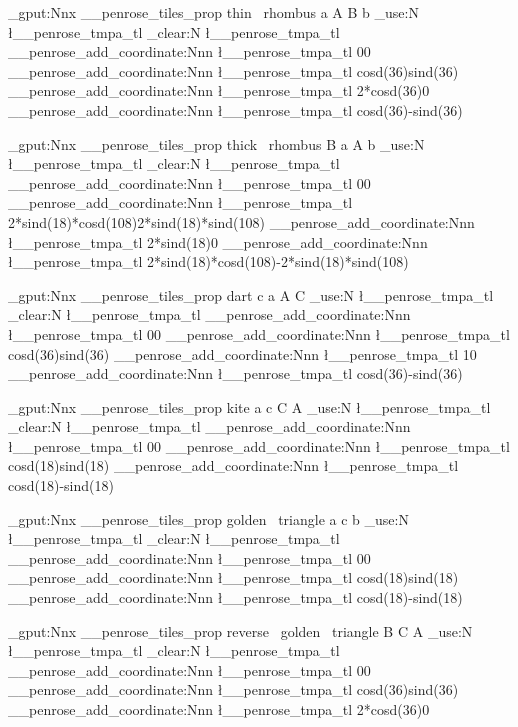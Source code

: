 \prop_gput:Nnx \g__penrose_tiles_prop {thin~ rhombus}
{{a A B b} {\tl_use:N \l__penrose_tmpa_tl}}
\tl_clear:N \l__penrose_tmpa_tl
\__penrose_add_coordinate:Nnn \l__penrose_tmpa_tl {0}{0}
\__penrose_add_coordinate:Nnn \l__penrose_tmpa_tl {cosd(36)}{sind(36)}
\__penrose_add_coordinate:Nnn \l__penrose_tmpa_tl {2*cosd(36)}{0}
\__penrose_add_coordinate:Nnn \l__penrose_tmpa_tl {cosd(36)}{-sind(36)}

\prop_gput:Nnx \g__penrose_tiles_prop {thick~ rhombus}
{{B a A b} {\tl_use:N \l__penrose_tmpa_tl}}
\tl_clear:N \l__penrose_tmpa_tl
\__penrose_add_coordinate:Nnn \l__penrose_tmpa_tl {0}{0}
\__penrose_add_coordinate:Nnn \l__penrose_tmpa_tl
{2*sind(18)*cosd(108)}{2*sind(18)*sind(108)}
\__penrose_add_coordinate:Nnn \l__penrose_tmpa_tl {2*sind(18)}{0}
\__penrose_add_coordinate:Nnn \l__penrose_tmpa_tl
{2*sind(18)*cosd(108)}{-2*sind(18)*sind(108)}

\prop_gput:Nnx \g__penrose_tiles_prop {dart}
{{c a A C} {\tl_use:N \l__penrose_tmpa_tl}}
\tl_clear:N \l__penrose_tmpa_tl
\__penrose_add_coordinate:Nnn \l__penrose_tmpa_tl {0}{0}
\__penrose_add_coordinate:Nnn \l__penrose_tmpa_tl {cosd(36)}{sind(36)}
\__penrose_add_coordinate:Nnn \l__penrose_tmpa_tl {1}{0}
\__penrose_add_coordinate:Nnn \l__penrose_tmpa_tl {cosd(36)}{-sind(36)}

\prop_gput:Nnx \g__penrose_tiles_prop {kite}
{{a c C A} {\tl_use:N \l__penrose_tmpa_tl}}
\tl_clear:N \l__penrose_tmpa_tl
\__penrose_add_coordinate:Nnn \l__penrose_tmpa_tl {0}{0}
\__penrose_add_coordinate:Nnn \l__penrose_tmpa_tl {cosd(18)}{sind(18)}
\__penrose_add_coordinate:Nnn \l__penrose_tmpa_tl {cosd(18)}{-sind(18)}

\prop_gput:Nnx \g__penrose_tiles_prop {golden~ triangle}
{{a c b} {\tl_use:N \l__penrose_tmpa_tl}}
\tl_clear:N \l__penrose_tmpa_tl
\__penrose_add_coordinate:Nnn \l__penrose_tmpa_tl {0}{0}
\__penrose_add_coordinate:Nnn \l__penrose_tmpa_tl {cosd(18)}{sind(18)}
\__penrose_add_coordinate:Nnn \l__penrose_tmpa_tl {cosd(18)}{-sind(18)}

\prop_gput:Nnx \g__penrose_tiles_prop {reverse~ golden~ triangle}
{{B C A} {\tl_use:N \l__penrose_tmpa_tl}}
\tl_clear:N \l__penrose_tmpa_tl
\__penrose_add_coordinate:Nnn \l__penrose_tmpa_tl {0}{0}
\__penrose_add_coordinate:Nnn \l__penrose_tmpa_tl {cosd(36)}{sind(36)}
\__penrose_add_coordinate:Nnn \l__penrose_tmpa_tl {2*cosd(36)}{0}

